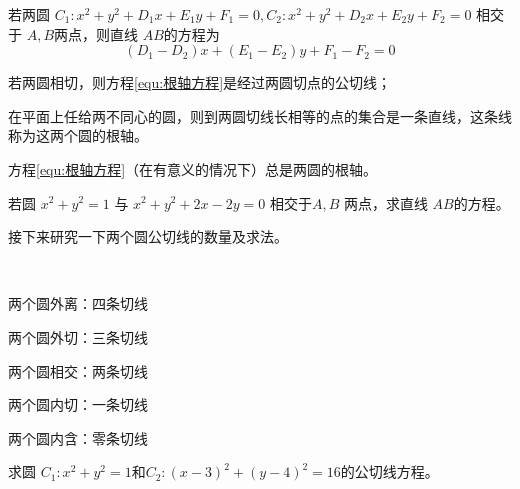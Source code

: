 \begin{theorem}
    若两圆  $C_{1}: x^{2}+y^{2}+D_{1} x+E_{1} y+F_{1}=0, C_{2}: x^{2}+y^{2}+D_{2} x+E_{2} y+F_{2}=0  $
    相交于 $ A, B  $两点，则直线 $ A B  $的方程为 
    \begin{equation}\label{equ:根轴方程}
         \left(D_{1}-D_{2}\right) x+\left(E_{1}-E_{2}\right) y+F_{1}-F_{2}=0 
    \end{equation}

    若两圆相切，则方程\ref{equ:根轴方程}是经过两圆切点的公切线；

    \begin{definition}[根轴]
        在平面上任给两不同心的圆，则到两圆切线长相等的点的集合是一条直线，这条线称为这两个圆的根轴。
    \end{definition}

    方程\ref{equ:根轴方程}（在有意义的情况下）总是两圆的根轴。
\end{theorem}
\begin{exercise}
     若圆 $x^{2}+y^{2}=1 $ 与 $ x^{2}+y^{2}+2 x-2 y=0 $ 相交于$  A ,B $ 两点，求直线  $A B $的方程。
\end{exercise}

接下来研究一下两个圆公切线的数量及求法。

\begin{theorem}[切线的数量]
\ 

    \begin{center}
        \begin{minipage}{0.3\textwidth} %
          \raggedright %
          两个圆外离：四条切线

       两个圆外切：三条切线

       两个圆相交：两条切线

       两个圆内切：一条切线

      两个圆内含：零条切线
        \end{minipage}
      \end{center}
\end{theorem}

\begin{example}
 求圆 $C_1:x^{2}+y^{2}=1 $和$C_2:(x-3)^{2}+(y-4)^{2}=16 $的公切线方程。
\end{example}



\clearpage




